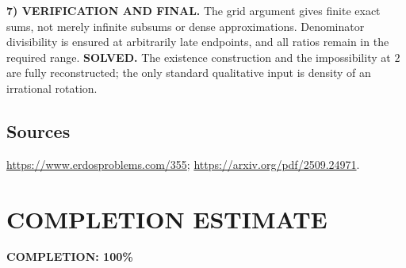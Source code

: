\noindent\textbf{7) VERIFICATION AND FINAL.}
The grid argument gives finite exact sums, not merely infinite subsums or dense approximations. Denominator divisibility is ensured at arbitrarily late endpoints, and all ratios remain in the required range. \textbf{SOLVED.} The existence construction and the impossibility at $2$ are fully reconstructed; the only standard qualitative input is density of an irrational rotation.

\subsection*{Sources}
\url{https://www.erdosproblems.com/355}; \url{https://arxiv.org/pdf/2509.24971}.

\section{COMPLETION ESTIMATE}
\textbf{COMPLETION: 100\%}
